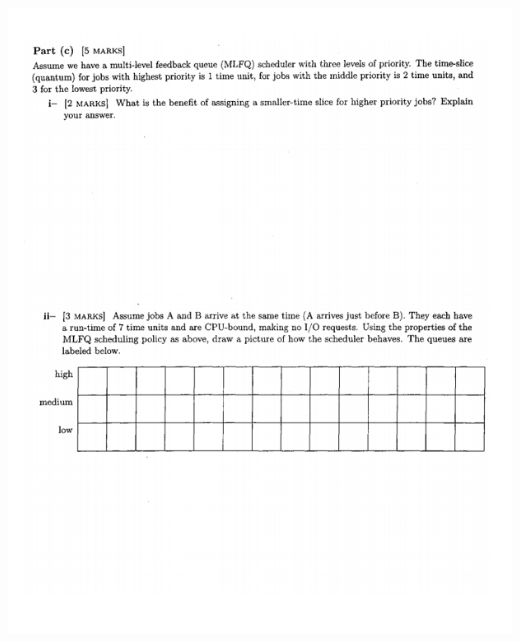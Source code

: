 \documentclass[12pt]{article}
\begin{document}
\begin{center}
    \includegraphics[width=\linewidth]{../../images/midterm_5_16.png}
\end{center}
\end{document}
